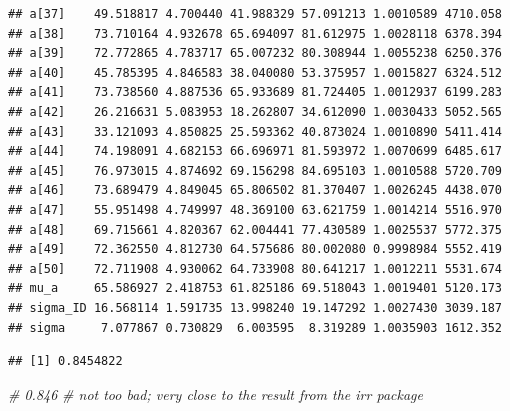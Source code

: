\documentclass[
]{book}
\newenvironment{Shaded}{\begin{snugshade}}{\end{snugshade}}
\newcommand{\CommentTok}[1]{\textcolor[rgb]{0.56,0.35,0.01}{\textit{#1}}}
\newcommand{\DecValTok}[1]{\textcolor[rgb]{0.00,0.00,0.81}{#1}}
\newcommand{\FloatTok}[1]{\textcolor[rgb]{0.00,0.00,0.81}{#1}}
\newcommand{\FunctionTok}[1]{\textcolor[rgb]{0.13,0.29,0.53}{\textbf{#1}}}
\newcommand{\NormalTok}[1]{#1}
\newcommand{\OtherTok}[1]{\textcolor[rgb]{0.56,0.35,0.01}{#1}}
\newcommand{\SpecialCharTok}[1]{\textcolor[rgb]{0.81,0.36,0.00}{\textbf{#1}}}
\begin{document}
\begin{verbatim}
## a[37]    49.518817 4.700440 41.988329 57.091213 1.0010589 4710.058
## a[38]    73.710164 4.932678 65.694097 81.612975 1.0028118 6378.394
## a[39]    72.772865 4.783717 65.007232 80.308944 1.0055238 6250.376
## a[40]    45.785395 4.846583 38.040080 53.375957 1.0015827 6324.512
## a[41]    73.738560 4.887536 65.933689 81.724405 1.0012937 6199.283
## a[42]    26.216631 5.083953 18.262807 34.612090 1.0030433 5052.565
## a[43]    33.121093 4.850825 25.593362 40.873024 1.0010890 5411.414
## a[44]    74.198091 4.682153 66.696971 81.593972 1.0070699 6485.617
## a[45]    76.973015 4.874692 69.156298 84.695103 1.0010588 5720.709
## a[46]    73.689479 4.849045 65.806502 81.370407 1.0026245 4438.070
## a[47]    55.951498 4.749997 48.369100 63.621759 1.0014214 5516.970
## a[48]    69.715661 4.820367 62.004441 77.430589 1.0025537 5772.375
## a[49]    72.362550 4.812730 64.575686 80.002080 0.9998984 5552.419
## a[50]    72.711908 4.930062 64.733908 80.641217 1.0012211 5531.674
## mu_a     65.586927 2.418753 61.825186 69.518043 1.0019401 5120.173
## sigma_ID 16.568114 1.591735 13.998240 19.147292 1.0027430 3039.187
## sigma     7.077867 0.730829  6.003595  8.319289 1.0035903 1612.352
\end{verbatim}

\begin{Shaded}
\end{Shaded}

\begin{verbatim}
## [1] 0.8454822
\end{verbatim}

\begin{Shaded}
\begin{Highlighting}[]
\CommentTok{\# 0.846}
\CommentTok{\# not too bad; very close to the result from the irr package}
\end{Highlighting}
\end{Shaded}
\end{document}
